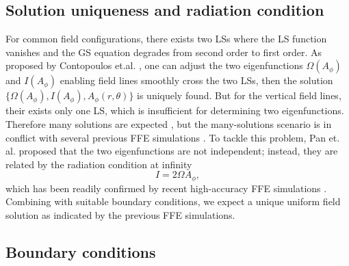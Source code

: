 \documentclass[aps,prd,reprint,nofootinbib, superscriptaddress]{revtex4-1}
\def\Ap{A_\phi}
\def\be{\begin{equation}}
\def\ee{\end{equation}}
\begin{document}
\subsection{Solution uniqueness and radiation condition}
For common field configurations, there exists two LSs where
the LS function vanishes and the GS equation degrades from second order to first order. As proposed
by Contopoulos et.al. \cite{Contopoulos2013}, one can adjust the two eigenfunctions $\Omega(\Ap)$
and $I(\Ap)$ enabling field lines smoothly cross the two LSs, then the solution
$\{\Omega(\Ap), I(\Ap), \Ap(r,\theta)\}$  is uniquely found. But for the vertical field lines, their
exists only one LS, which is insufficient for determining two eigenfunctions.
Therefore many solutions are expected \cite{Nathanail2014, Mahlmann2018}, but the many-solutions scenario is in
conflict with several previous FFE simulations \cite{Komissarov2004e, Komissarov2005,
Komissarov2007,Palenzuela2010,Paschalidis2013,Yang2015,Carrasco2017}.
To tackle this problem,  Pan et. al. \cite{Pan2016a, Pan2017} proposed that the two eigenfunctions are not independent;
instead, they are related by the radiation condition at infinity
\be I = 2\Omega A_\phi, \label{eq:rad}\ee
which has been readily confirmed by recent high-accuracy FFE simulations \cite{East2018}.
Combining with suitable boundary conditions, we expect a unique uniform field solution as indicated
by the previous FFE simulations.

\subsection{Boundary conditions}
\end{document}
